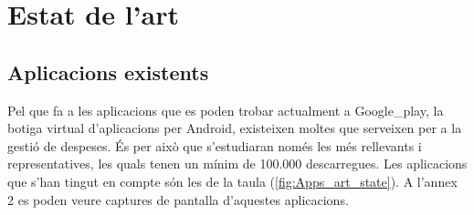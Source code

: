 \chapter{Estat de l'art}
\section{Aplicacions existents}
Pel que fa a les aplicacions que es poden trobar actualment a \gls{Google_play}, la botiga virtual d'aplicacions per \gls{Android}, existeixen moltes que serveixen per a la gestió de despeses. És per això que s'estudiaran només les més rellevants i representatives, les quals tenen un mínim de 100.000 descarregues. Les aplicacions que s'han tingut en compte són les de la taula (\ref{fig:Apps_art_state}). A l'annex 2 es poden veure captures de pantalla d'aquestes aplicacions. 

